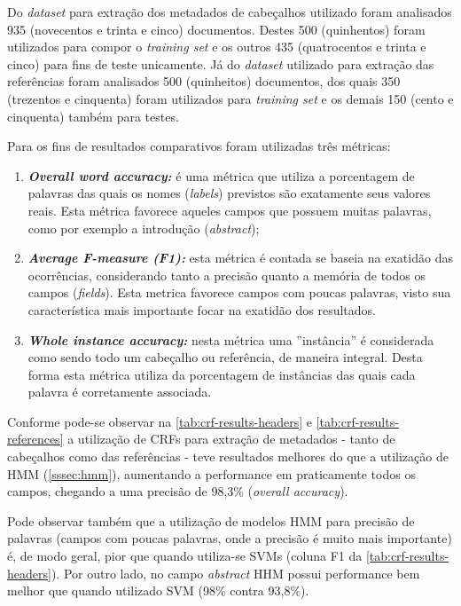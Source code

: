 \begin{textnew}
Do \emph{dataset} para extração dos metadados de cabeçalhos utilizado foram analisados 935 (novecentos e trinta e cinco) documentos. Destes 500 (quinhentos) foram utilizados para compor o \emph{training set} e os outros 435 (quatrocentos e trinta e cinco) para fins de teste unicamente. Já do \emph{dataset} utilizado para extração das referências foram analisados 500 (quinheitos) documentos, dos quais 350 (trezentos e cinquenta) foram utilizados para \emph{training set} e os demais 150 (cento e cinquenta) também para testes.

Para os fins de resultados comparativos foram utilizadas três métricas:

\begin{enumerate}
    \item \emph{\textbf{Overall word accuracy:}} é uma métrica que utiliza a porcentagem de palavras das quais os nomes (\emph{labels}) previstos são exatamente seus valores reais. Esta métrica favorece aqueles campos que possuem muitas palavras, como por exemplo a introdução (\emph{abstract});
    \item \emph{\textbf{Average F-measure (F1):}} esta métrica é contada se baseia na exatidão das ocorrências, considerando tanto a precisão quanto a memória de todos os campos (\emph{fields}). Esta metrica favorece campos com poucas palavras, visto sua característica mais importante focar na exatidão dos resultados.
    \item \emph{\textbf{Whole instance accuracy:}} nesta métrica uma ''instância'' é considerada como sendo todo um cabeçalho ou referência, de maneira integral. Desta forma esta métrica utiliza da porcentagem de instâncias das quais cada palavra é corretamente associada.
\end{enumerate}

Conforme pode-se observar na \autoref{tab:crf-results-headers} e \autoref{tab:crf-results-references} a utilização de CRFs para extração de metadados - tanto de cabeçalhos como das referências - teve resultados melhores do que a utilização de HMM (\autoref{sssec:hmm}), aumentando a performance em praticamente todos os campos, chegando a uma precisão de 98,3\% (\emph{overall accuracy}).

Pode observar também que a utilização de modelos HMM para precisão de palavras (campos com poucas palavras, onde a precisão é muito mais importante) é, de modo geral, pior que quando utiliza-se SVMs (coluna F1 da \autoref{tab:crf-results-headers}). Por outro lado, no campo \emph{abstract} HHM possui performance bem melhor que quando utilizado SVM (98\% contra 93,8\%).


\end{textnew}
